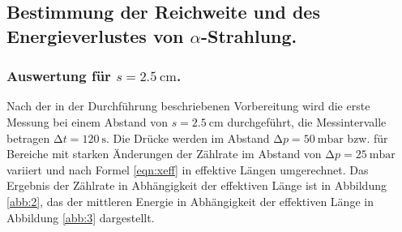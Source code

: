
\subsection{\texorpdfstring{Bestimmung der Reichweite und des Energieverlustes von $\alpha$-Strahlung}{Bestimmung der Reichweite und des Energieverlustes von Alpha-Strahlung}.}

\subsubsection{\texorpdfstring{Auswertung für $s=\SI{2.5}{\centi\metre}$}{Auswertung für s = 2.5 cm}.}

Nach der in der Durchführung beschriebenen Vorbereitung wird die erste Messung bei einem Abstand von $s = \SI{2.5}{\centi\metre}$ durchgeführt, die Messintervalle betragen $\increment t = \SI{120}{\second}$.
Die Drücke werden im Abstand $\increment p = \SI{50}{\milli\bar}$ bzw. für Bereiche mit starken Änderungen der Zählrate im Abstand von $\increment p = \SI{25}{\milli\bar}$ variiert und nach Formel \eqref{eqn:xeff} in effektive Längen umgerechnet.
Das Ergebnis der Zählrate in Abhängigkeit der effektiven Länge ist in Abbildung \ref{abb:2}, das der mittleren Energie in Abhängigkeit der effektiven Länge in Abbildung \ref{abb:3} dargestellt.

